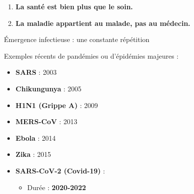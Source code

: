 \documentclass[
  ignorenonframetext,
]{beamer}
\providecommand{\tightlist}{%
  \setlength{\itemsep}{0pt}\setlength{\parskip}{0pt}}\usepackage{longtable,booktabs,array}
\begin{document}
\begin{frame}
\begin{tcolorbox}[enhanced jigsaw, rightrule=.15mm, opacityback=0, colframe=quarto-callout-important-color-frame, bottomtitle=1mm, toptitle=1mm, left=2mm, leftrule=.75mm, title=\textcolor{quarto-callout-important-color}{\faExclamation}\hspace{0.5em}{À retenir :}, toprule=.15mm, breakable, colback=white, coltitle=black, opacitybacktitle=0.6, titlerule=0mm, bottomrule=.15mm, colbacktitle=quarto-callout-important-color!10!white, arc=.35mm]

\begin{enumerate}
\tightlist
\item
  \textbf{La santé est bien plus que le soin.}\\
\item
  \textbf{La maladie appartient au malade, pas au médecin.}\\
\end{enumerate}

\end{tcolorbox}
\end{frame}

\begin{frame}{Émergence infectieuse : une constante répétition}
\protect\hypertarget{uxe9mergence-infectieuse-une-constante-ruxe9puxe9tition}{}
\begin{block}{Exemples récents de pandémies ou d'épidémies majeures :}
\protect\hypertarget{exemples-ruxe9cents-de-panduxe9mies-ou-duxe9piduxe9mies-majeures}{}
\begin{itemize}
\tightlist
\item
  \textbf{SARS} : 2003\\
\item
  \textbf{Chikungunya} : 2005\\
\item
  \textbf{H1N1 (Grippe A)} : 2009\\
\item
  \textbf{MERS-CoV} : 2013\\
\item
  \textbf{Ebola} : 2014\\
\item
  \textbf{Zika} : 2015\\
\item
  \textbf{SARS-CoV-2 (Covid-19)} :

  \begin{itemize}
  \tightlist
  \item
    Durée : \textbf{2020-2022}
  \end{itemize}
\end{itemize}
\end{block}
\end{frame}
\end{document}
